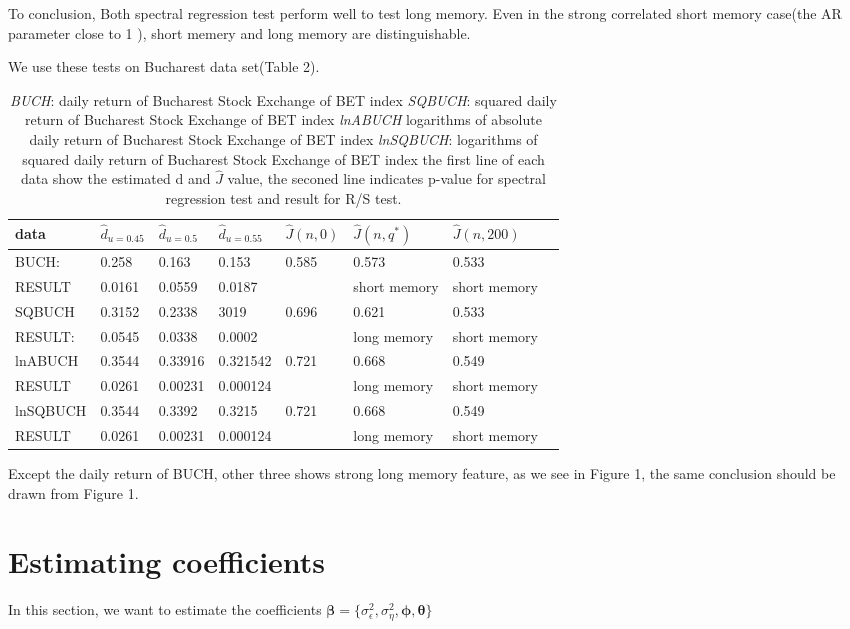 \documentclass[10pt,a4paper]{article}
\begin{document}
To conclusion, Both spectral regression test perform well to test long memory. Even in the strong correlated short memory case(the AR parameter close to 1 ), short memery and long memory are distinguishable.

We use these tests on Bucharest data set(Table 2). 

\begin{table}[!hbp]
\begin{tabular}{llllllll}
\hline
\hline
data & $\hat{d}_{u=0.45}$ & $\hat{d}_{u=0.5}$ & $\hat{d}_{u=0.55}$ & $\hat{J}(n,0) $& $\hat{J}(n,q^*) $&$\hat{J}(n,200)$ \\
\hline
BUCH: & 0.258 & 0.163 &  0.153 & 0.585 &     0.573 & 0.533 \\
RESULT& 0.0161 & 0.0559  & 0.0187 & \, &   short memory &  short memory\\
\hline
SQBUCH  & 0.3152 & 0.2338   & 3019 & 0.696  &   0.621 & 0.533\\
RESULT: & 0.0545 &0.0338  & 0.0002  & \, &   long memory & short memory \\
\hline
lnABUCH& 0.3544 & 0.33916  & 0.321542 & 0.721 &   0.668 & 0.549\\
RESULT & 0.0261 &  0.00231  & 0.000124 & \,  &  long memory & short memory\\
\hline
lnSQBUCH &0.3544 & 0.3392 &  0.3215 & 0.721 &     0.668 & 0.549 \\
RESULT& 0.0261  & 0.00231  & 0.000124  & \,  &   long memory &  short memory\\
\hline
\end{tabular}
\caption{\emph{BUCH}: daily return of Bucharest Stock Exchange of BET index\qquad
\emph{SQBUCH}: squared daily return of Bucharest Stock Exchange of BET index \qquad \emph{lnABUCH} logarithms of absolute daily return of Bucharest Stock Exchange of BET index \qquad \emph{lnSQBUCH}: logarithms of squared daily return of Bucharest Stock Exchange of BET index \qquad\qquad the first line of each data show the estimated d and $\hat{J}$ value, the seconed line indicates p-value for spectral regression test and result for R/S test.
}

\end{table}
Except the daily return of BUCH, other three shows strong long memory feature, as we see in Figure 1, the same conclusion should be drawn from Figure 1.
 
\section{Estimating coefficients}
In this section, we want to estimate the coefficients $\bm{\beta}=\{\sigma_\epsilon^2,\sigma_\eta^2,\bm{\phi,\bm{\theta}}\}$
\end{document}
